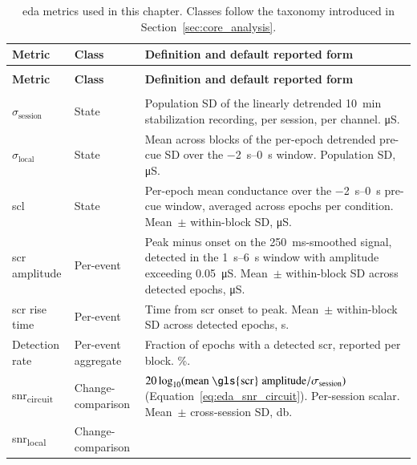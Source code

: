 {\small
\begin{xltabular}{\widetable}{>{\raggedright\arraybackslash}p{3.6cm} l >{\raggedright\arraybackslash}X}
\caption{\gls{eda} metrics used in this chapter. Classes follow the taxonomy introduced in Section~\ref{sec:core_analysis}.}
\label{tab:eda-metrics} \\
\toprule
\textbf{Metric} & \textbf{Class} & \textbf{Definition and default reported form} \\
\midrule
\endfirsthead
{} \\
\toprule
\textbf{Metric} & \textbf{Class} & \textbf{Definition and default reported form} \\
\midrule
\endhead
\midrule
{} \\
\endfoot
\bottomrule
\endlastfoot
$\sigma_\text{session}$ & State &
Population SD of the linearly detrended \SI{10}{\minute} stabilization recording, per session, per channel. \si{\micro\siemens}. \\
\addlinespace
$\sigma_\text{local}$ & State &
Mean across blocks of the per-epoch detrended pre-cue SD over the \SIrange{-2}{0}{\second} window. Population SD, \si{\micro\siemens}. \\
\addlinespace
\gls{scl} & State &
Per-epoch mean conductance over the \SIrange{-2}{0}{\second} pre-cue window, averaged across epochs per condition. Mean~$\pm$ within-block SD, \si{\micro\siemens}. \\
\addlinespace
\gls{scr} amplitude & Per-event &
Peak minus onset on the \SI{250}{\milli\second}-smoothed signal, detected in the \SIrange{1}{6}{\second} window with amplitude exceeding \SI{0.05}{\micro\siemens}. Mean~$\pm$ within-block SD across detected epochs, \si{\micro\siemens}. \\
\addlinespace
\gls{scr} rise time & Per-event &
Time from \gls{scr} onset to peak. Mean~$\pm$ within-block SD across detected epochs, \si{\second}. \\
\addlinespace
Detection rate & Per-event aggregate &
Fraction of epochs with a detected \gls{scr}, reported per block. \si{\percent}. \\
\addlinespace
\gls{snr}\textsubscript{circuit} & Change-comparison &
$20\log_{10}(\text{mean \gls{scr} amplitude} / \sigma_\text{session})$ (Equation~\ref{eq:eda_snr_circuit}). Per-session scalar. Mean~$\pm$ cross-session SD, \si{\decibel}. \\
\addlinespace
\gls{snr}\textsubscript{local} & Change-comparison &

\end{xltabular}}
